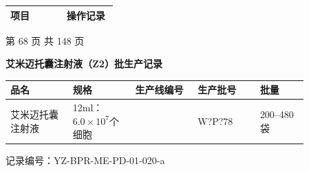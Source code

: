 \documentclass[UTF8,10pt,a4paper,fontset=fandol]{ctexart}
\newcommand{\fieldvalue}[1]{#1}
\newcommand{\handwritten}[1]{#1}
\begin{document}
\begin{tabular}{|p{0.50\linewidth}|p{0.45\linewidth}|}
\hline
项目 & 操作记录\\
\hline
\end{tabular}

\begin{center}
第 68 页 共 148 页
\end{center}

\newpage

\begin{center}
\textbf{艾米迈托囊注射液（Z2）批生产记录}
\end{center}

\begin{tabular}{|p{0.18\linewidth}|p{0.18\linewidth}|p{0.18\linewidth}|p{0.18\linewidth}|p{0.14\linewidth}|}
\hline
品名 & 规格 & 生产线编号 & 生产批号 & 批量\\
\hline
艾米迈托囊注射液 & 12ml：$6.0\times10^7$个细胞 &
\multicolumn{1}{c|}{} &
\fieldvalue{\handwritten{W?P?78}} &
200--480袋\\
\hline
\end{tabular}

\vspace{0.2em}

\noindent
记录编号：YZ-BPR-ME-PD-01-020-a

\vspace{0.4em}
\end{document}
